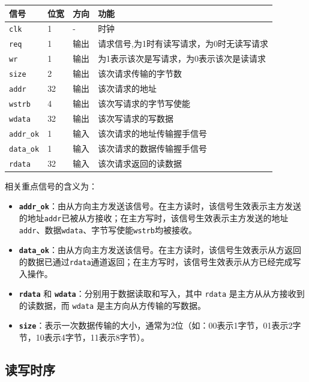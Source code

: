\begin{longtable}[]{@{}llll@{}}
\toprule\noalign{}
信号 & 位宽 & 方向 & 功能 \\
\midrule\noalign{}
\endhead
\bottomrule\noalign{}
\endlastfoot
\texttt{clk} & 1 & - & 时钟 \\
\texttt{req} & 1 & 输出 & 请求信号,为1时有读写请求，为0时无读写请求 \\
\texttt{wr} & 1 & 输出 & 为1表示该次是写请求，为0表示该次是读请求 \\
\texttt{size} & 2 & 输出 & 该次请求传输的字节数 \\
\texttt{addr} & 32 & 输出 & 该次请求的地址 \\
\texttt{wstrb} & 4 & 输出 & 该次写请求的字节写使能 \\
\texttt{wdata} & 32 & 输出 & 该次写请求的写数据 \\
\texttt{addr\_ok} & 1 & 输入 & 该次请求的地址传输握手信号 \\
\texttt{data\_ok} & 1 & 输入 & 该次请求的数据传输握手信号 \\
\texttt{rdata} & 32 & 输入 & 该次请求返回的读数据 \\
\end{longtable}

相关重点信号的含义为：

\begin{itemize}
\item
  \textbf{\texttt{addr\_ok}}：由从方向主方发送该信号。在主方读时，该信号生效表示主方发送的地址\texttt{addr}已被从方接收；在主方写时，该信号生效表示主方发送的地址\texttt{addr}、数据\texttt{wdata}、字节写使能\texttt{wstrb}均被接收。
\item
  \textbf{\texttt{data\_ok}}：由从方向主方发送该信号。在主方读时，该信号生效表示从方返回的数据已通过\texttt{rdata}通道返回；在主方写时，该信号生效表示从方已经完成写入操作。
\item
  \textbf{\texttt{rdata}} 和 \textbf{\texttt{wdata}}：分别用于数据读取和写入，其中 \texttt{rdata} 是主方从从方接收到的读数据，而 \texttt{wdata} 是主方向从方传输的写数据。
\item
  \textbf{\texttt{size}}：表示一次数据传输的大小，通常为2位（如：00表示1字节，01表示2字节，10表示4字节，11表示8字节）。
\end{itemize}

\subsection{读写时序}\label{sec:08-bus-and-soc-005}


